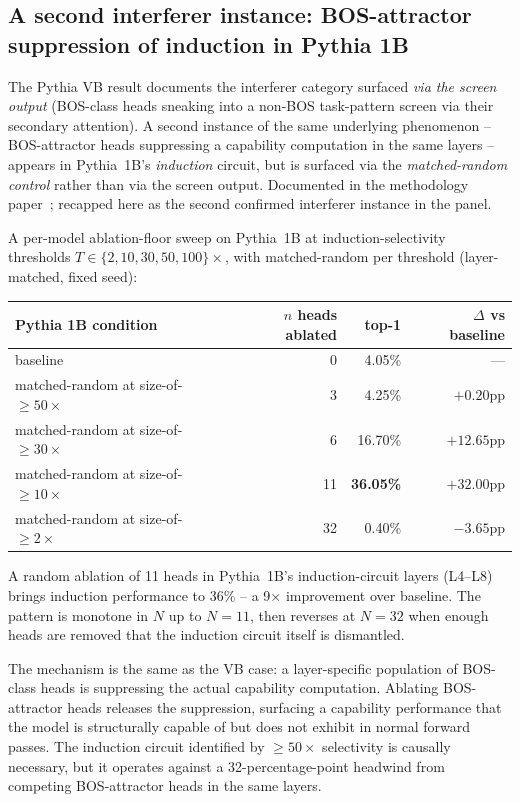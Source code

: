 \documentclass[11pt]{article}
\begin{document}
\subsection{A second interferer instance: BOS-attractor suppression of induction in Pythia 1B}
\label{sec:bos_suppression_induction}

The Pythia VB result documents the interferer category surfaced \emph{via the screen output} (BOS-class heads sneaking into a non-BOS task-pattern screen via their secondary attention). A second instance of the same underlying phenomenon -- BOS-attractor heads suppressing a capability computation in the same layers -- appears in Pythia~1B's \emph{induction} circuit, but is surfaced via the \emph{matched-random control} rather than via the screen output. Documented in the methodology paper~\citep[\S5.5]{paper1_methodology}; recapped here as the second confirmed interferer instance in the panel.

A per-model ablation-floor sweep on Pythia~1B at induction-selectivity thresholds $T \in \{2, 10, 30, 50, 100\}\times$, with matched-random per threshold (layer-matched, fixed seed):

\begin{center}
\footnotesize
\begin{tabular}{lrrr}
\toprule
Pythia 1B condition & $n$ heads ablated & top-1 & $\Delta$ vs baseline \\
\midrule
baseline                                       & 0  & 4.05\%       & --- \\
matched-random at size-of-$\geq 50\times$      & 3  & 4.25\%       & $+0.20$pp \\
matched-random at size-of-$\geq 30\times$      & 6  & 16.70\%      & $\mathbf{+12.65}$pp \\
matched-random at size-of-$\geq 10\times$      & 11 & \textbf{36.05\%} & $\mathbf{+32.00}$pp \\
matched-random at size-of-$\geq 2\times$       & 32 & 0.40\%       & $-3.65$pp \\
\bottomrule
\end{tabular}
\end{center}

A random ablation of 11 heads in Pythia~1B's induction-circuit layers (L4--L8) brings induction performance to 36\% -- a 9$\times$ improvement over baseline. The pattern is monotone in $N$ up to $N=11$, then reverses at $N=32$ when enough heads are removed that the induction circuit itself is dismantled.

The mechanism is the same as the VB case: a layer-specific population of BOS-class heads is suppressing the actual capability computation. Ablating BOS-attractor heads releases the suppression, surfacing a capability performance that the model is structurally capable of but does not exhibit in normal forward passes. The induction circuit identified by $\geq 50\times$ selectivity is causally necessary, but it operates against a 32-percentage-point headwind from competing BOS-attractor heads in the same layers.
\end{document}
